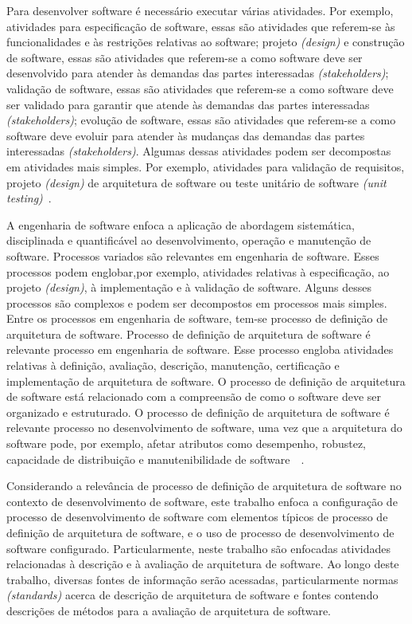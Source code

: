 Para desenvolver software é necessário executar várias atividades. Por exemplo, atividades para especificação de software, essas são atividades que referem-se às funcionalidades e às restrições relativas ao software; projeto \emph{(design)} e construção de software, essas são atividades que referem-se a como software deve ser desenvolvido para atender às demandas das partes interessadas \emph{(stakeholders)}; validação de software, essas são atividades que referem-se a como software deve ser validado para garantir que atende às demandas das partes interessadas \emph{(stakeholders)}; evolução de software, essas são atividades que referem-se a como software deve evoluir para atender às mudanças das demandas das partes interessadas \emph{ (stakeholders)}. Algumas dessas atividades podem ser decompostas em atividades mais simples. Por exemplo, atividades para validação de requisitos,  projeto \emph{(design)} de arquitetura de software ou teste unitário de software \emph{(unit testing)}~\cite{Sommerville_2011_texbook}.

A engenharia de software enfoca a aplicação de abordagem sistemática, disciplinada e quantificável ao desenvolvimento, operação e manutenção de software. Processos variados são relevantes em engenharia de software. Esses processos podem englobar,por exemplo, atividades relativas à especificação, ao projeto \emph{(design)}, à implementação e à validação de software. Alguns desses processos são complexos e podem ser decompostos em processos mais simples. Entre os processos em engenharia de software, tem-se processo de definição de arquitetura de software. Processo de definição de arquitetura de software é relevante processo em engenharia de software. Esse processo engloba atividades relativas à definição, avaliação, descrição, manutenção, certificação e implementação de arquitetura de software. O processo de definição de arquitetura de software está relacionado com a compreensão de como o software deve ser organizado e estruturado. O processo de definição de arquitetura de software é relevante processo no desenvolvimento de software, uma vez que a arquitetura do software pode, por exemplo, afetar atributos como desempenho, robustez, capacidade de distribuição e manutenibilidade de software~\cite{Sommerville_2011_texbook}~\cite{Swebok}. 

Considerando a relevância de processo de definição de arquitetura de software no contexto de desenvolvimento de software, este trabalho enfoca a configuração de processo de desenvolvimento de software com elementos típicos de processo de definição de arquitetura de software, e o uso de processo de desenvolvimento de software configurado. Particularmente, neste trabalho são enfocadas atividades relacionadas à descrição e à avaliação de arquitetura de software. Ao longo deste trabalho, diversas fontes de informação serão acessadas, particularmente normas \emph{(standards)}  acerca de descrição de arquitetura de software e fontes contendo descrições de métodos para a avaliação de arquitetura de software.

